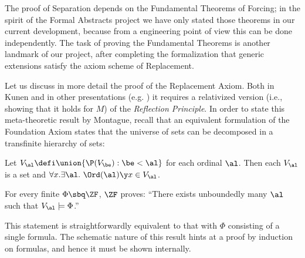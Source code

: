 \medskip
{}

\medskip


The proof of Separation depends on the Fundamental Theorems of
Forcing; in the spirit of the Formal Abstracts project we have only
stated those theorems in our current development, because from a
engineering point of view this can be done independently. The task of
proving the Fundamental Theorems is another landmark of our project,
after completing the formalization that generic extensions satisfy
the axiom scheme of Replacement.



Let us discuss in more detail the proof of the Replacement Axiom. Both
in Kunen and in other presentations (e.g. \cite{neeman-course}) it
requires a relativized version (i.e., showing that it holds for $M$)
of the \emph{Reflection Principle}. In order to state this
meta-theoretic result by Montague, recall that an equivalent
formulation of the Foundation Axiom states that the universe of sets
can be decomposed in a transfinite hierarchy of sets:
\begin{theorem}
  Let $V_{\al}\defi\union\{\P(V_\be) : \be<\al\}$ for each ordinal
  $\al$. Then each $V_\al$ is a set and 
  $\forall x. \exists\al .\ \Ord(\al) \y x\in V_\al$.  
\end{theorem}
\begin{theorem}\label{th:reflection-principle}
  For every finite $\Phi\sbq\ZF$, $\ZF$ proves: ``There exists
  unboundedly many $\al$ such that $V_\al\models \Phi$.''
\end{theorem}

This statement is straightforwardly equivalent to that with $\Phi$
consisting of a single formula. The schematic nature of this result
hints at a proof by induction on formulas, and hence it must be shown
internally. 

